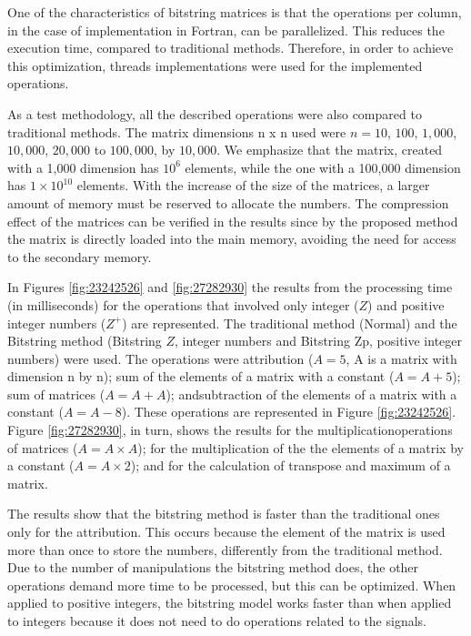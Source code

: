 \documentclass[10pt]{article}
\begin{document}
One of the characteristics of bitstring matrices is that the operations per column, in the case of implementation in 
Fortran, can be parallelized. This reduces the execution time, compared to traditional methods. Therefore, in order to 
achieve this optimization, threads implementations were used for the implemented operations.

As a test methodology, all the described operations were also compared to traditional methods. The matrix dimensions n x 
n used were $n = 10$, $100$, $1,000$, $10,000$, $20,000$ to $100,000$, by $10,000$. We emphasize that the matrix,  
created with a 1,000 dimension has $10^6$ elements, while the one with a 100,000 dimension has $1 \times 10^{10}$ 
elements. With the increase of the size of the matrices, a larger amount of memory must be reserved to allocate the 
numbers. The compression effect of the matrices can be verified in the results since by the proposed method the matrix 
is ​​directly loaded into the main memory, avoiding the need for access to the secondary memory.

In Figures \ref{fig:23242526} and \ref{fig:27282930} the results from the processing time (in milliseconds) 
for the operations that involved only integer ($Z$) and positive integer numbers ($Z^+$) are represented. 
The traditional method (Normal) and the Bitstring method (Bitstring $Z$, integer numbers and Bitstring Zp, 
positive integer numbers) were used. The operations were attribution ($A=5$, A is a matrix with dimension n by n); 
sum of the elements of a matrix with a constant ($A=A+5$); sum of matrices ($A=A+A$); andsubtraction of the elements 
of a matrix with a constant ($A=A-8$). These operations are represented in Figure \ref{fig:23242526}. 
Figure \ref{fig:27282930}, in turn, shows the results for the multiplicationoperations of matrices ($A = A \times A$); 
for the multiplication of the the elements of a matrix by a constant ($A=A \times 2$); 
and for the calculation of transpose and maximum of a matrix.

The results show that the bitstring method is faster than the traditional ones only for the attribution.
This occurs because the element of the matrix is used more than once to store the numbers, differently 
from the traditional method. Due to the number of manipulations  the bitstring method does, the other 
operations  demand more time to be processed, but this can be optimized. When applied to positive integers, 
the bitstring model works faster than when applied to integers because it does not need to do operations 
related to the signals.
\end{document}
